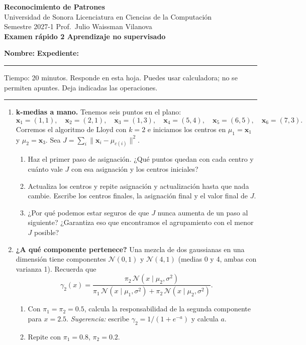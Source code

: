 \documentclass[11pt]{article}
\newcommand{\vx}{\mathbf{x}}
\newcommand{\encabezado}[2]{%
\begin{center}
{\large\bfseries Reconocimiento de Patrones}\\[2pt]
Universidad de Sonora \textperiodcentered{} Licenciatura en Ciencias de la Computación\\
Semestre 2027-1 \textperiodcentered{} Prof.\ Julio Waissman Vilanova\\[10pt]
{\Large\bfseries #1}%
\ifdefined\tipodoc\\[4pt]{\large\itshape\tipodoc}\fi
\end{center}
\ifdefined\tipodoc\else
\vspace{6pt}
\textbf{Nombre:} \hrulefill\quad \textbf{Expediente:} \rule{3.5cm}{0.4pt}\par
\vspace{6pt}
\fi
#2
\par\medskip\hrule\medskip
}
\newcommand{\espacio}[1]{\par\vspace{#1}}
\newcommand{\nuevapagina}{\newpage}
\begin{document}
\encabezado{Examen rápido 2 \textperiodcentered{} Aprendizaje no supervisado}{%
Tiempo: 20 minutos. Responde en esta hoja. Puedes usar calculadora; no se permiten apuntes. Deja indicadas las operaciones.}

\begin{enumerate}

\item \textbf{k-medias a mano.} Tenemos seis puntos en el plano:
\[
\vx_1 = (1, 1),\quad \vx_2 = (2, 1),\quad \vx_3 = (1, 3),\quad \vx_4 = (5, 4),\quad \vx_5 = (6, 5),\quad \vx_6 = (7, 3).
\]
Corremos el algoritmo de Lloyd con $k = 2$ e iniciamos los centros en $\mu_1 = \vx_1$ y $\mu_2 = \vx_3$. Sea $J = \sum_i \lVert \vx_i - \mu_{c(i)} \rVert^2$.

\begin{enumerate}
  \item Haz el primer paso de asignación. ¿Qué puntos quedan con cada centro y cuánto vale $J$ con esa asignación y los centros iniciales?
  \espacio{3.2cm}

  \item Actualiza los centros y repite asignación y actualización hasta que nada cambie. Escribe los centros finales, la asignación final y el valor final de $J$.
  \espacio{5.5cm}

  \item ¿Por qué podemos estar seguros de que $J$ nunca aumenta de un paso al siguiente? ¿Garantiza eso que encontramos el agrupamiento con el menor $J$ posible?
  \espacio{2.5cm}
\end{enumerate}

\nuevapagina
\item \textbf{¿A qué componente pertenece?} Una mezcla de dos gaussianas en una dimensión tiene componentes $\mathcal N(0, 1)$ y $\mathcal N(4, 1)$ (medias 0 y 4, ambas con varianza 1). Recuerda que
\[
\gamma_{2}(x) = \frac{\pi_2\, \mathcal N(x \mid \mu_2, \sigma^2)}{\pi_1\, \mathcal N(x \mid \mu_1, \sigma^2) + \pi_2\, \mathcal N(x \mid \mu_2, \sigma^2)} .
\]
\begin{enumerate}
  \item Con $\pi_1 = \pi_2 = 0.5$, calcula la responsabilidad de la segunda componente para $x = 2.5$. \emph{Sugerencia:} escribe $\gamma_2 = 1/(1 + e^{-a})$ y calcula $a$.
  \espacio{3cm}

  \item Repite con $\pi_1 = 0.8$, $\pi_2 = 0.2$.
  \espacio{2cm}


\end{enumerate}
\end{enumerate}
\end{document}
